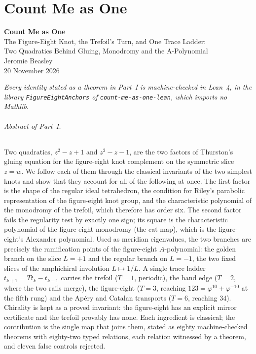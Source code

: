 \documentclass[11pt]{article}
\theoremstyle{definition}
\begin{document}
\tableofcontents
\clearpage
\part{Count Me as One}
\begin{center}\textbf{Count Me as One}\\[4pt]\large The Figure-Eight Knot, the Trefoil's Turn, and One Trace Ladder:\\ Two Quadratics Behind Gluing, Monodromy and the A-Polynomial\\[6pt]\normalsize Jeromie Beasley\\ 20 November 2026\end{center}

\noindent\small\textit{Every identity stated as a theorem in Part~I is machine-checked in Lean~4, in the library \texttt{FigureEightAnchors} of \texttt{count-me-as-one-lean}, which imports no Mathlib.}\normalsize

\paragraph{Abstract of Part~I.}
Two quadratics, $z^2-z+1$ and $z^2-z-1$, are the two factors of Thurston's gluing equation for the figure-eight knot complement on the symmetric slice $z=w$. We follow each of them through the classical invariants of the two simplest knots and show that they account for all of the following at once. The first factor is the shape of the regular ideal tetrahedron, the condition for Riley's parabolic representation of the figure-eight knot group, and the characteristic polynomial of the monodromy of the trefoil, which therefore has order six. The second factor fails the regularity test by exactly one sign; its square is the characteristic polynomial of the figure-eight monodromy (the cat map), which is the figure-eight's Alexander polynomial. Used as meridian eigenvalues, the two branches are precisely the ramification points of the figure-eight $A$-polynomial: the golden branch on the slice $L=+1$ and the regular branch on $L=-1$, the two fixed slices of the amphichiral involution $L\mapsto 1/L$. A single trace ladder $t_{k+1}=Tt_k-t_{k-1}$ carries the trefoil ($T=1$, periodic), the band edge ($T=2$, where the two rails merge), the figure-eight ($T=3$, reaching $123=\varphi^{10}+\varphi^{-10}$ at the fifth rung) and the Ap\'ery and Catalan transports ($T=6$, reaching $34$). Chirality is kept as a proved invariant: the figure-eight has an explicit mirror certificate and the trefoil provably has none. Each ingredient is classical; the contribution is the single map that joins them, stated as eighty machine-checked theorems with eighty-two typed relations, each relation witnessed by a theorem, and eleven false controls rejected.
\end{document}
